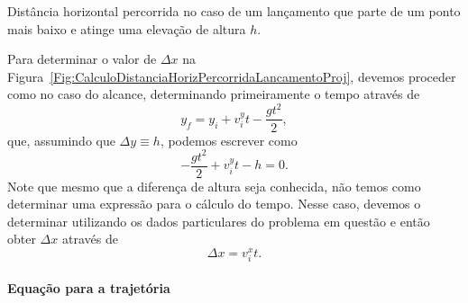 \begin{marginfigure}[-1cm]
\centering
{}
\caption{Distância horizontal percorrida no caso de um lançamento que parte de um ponto mais baixo e atinge uma elevação de altura $h$.\label{Fig:CalculoDistanciaHorizPercorridaLancamentoProj}}
\end{marginfigure}

Para determinar o valor de $\Delta x$ na Figura~\ref{Fig:CalculoDistanciaHorizPercorridaLancamentoProj}, devemos proceder como no caso do alcance, determinando primeiramente o tempo através de
\begin{equation}
	y_f = y_i + v_{i}^{y}t - \frac{gt^2}{2},
\end{equation}
%
que, assumindo que $\Delta y \equiv h$, podemos escrever como
\begin{equation}
	- \frac{gt^2}{2} + v_{i}^{y}t - h = 0.
\end{equation}
%
Note que mesmo que a diferença de altura seja conhecida, não temos como determinar uma expressão para o cálculo do tempo. Nesse caso, devemos o determinar utilizando os dados particulares do problema em questão e então obter $\Delta x$ através de
\begin{equation}
	\Delta x = v_{i}^{x} t.
\end{equation}

\paragraph{Equação para a trajetória}

